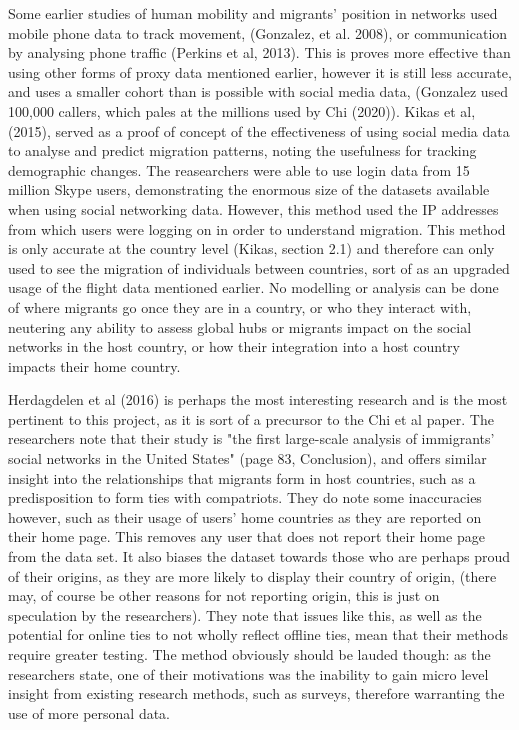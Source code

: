 \documentclass[12pt]{article}
\begin{document}
Some earlier studies of human mobility and migrants' position in networks used mobile phone data to 
track movement, (Gonzalez, et al. 2008), or communication by analysing phone traffic (Perkins et al, 2013).
This is proves more effective than using other forms of proxy data mentioned earlier,  
however it is still less accurate, and uses a smaller cohort than is possible with social media 
data, (Gonzalez used 100,000 callers, which pales at the millions used by Chi (2020)). 
Kikas et al, (2015), served as a proof of concept of the effectiveness of using social 
media data to analyse and predict migration patterns, noting the usefulness for tracking 
demographic changes. The reasearchers were able to use login data from 15 million 
Skype users, demonstrating the enormous size of the datasets available when using social 
networking data. However, this method used the IP addresses from which users were logging 
on in order to understand migration. This method is only accurate at the country level (Kikas, section 2.1)
and therefore can only used to see the migration of individuals between countries,
sort of as an upgraded usage of the flight data mentioned earlier. No modelling or 
analysis can be done of where migrants go once they are in a country, or who they interact 
with, neutering any ability to assess global hubs or migrants impact on the social 
networks in the host country, or how their integration into a host country impacts their 
home country.

Herdagdelen et al (2016) is perhaps the most interesting research and is the most 
pertinent to this project, as it is sort of a precursor to the Chi et al paper. The researchers 
note that their study is "the first large-scale analysis of immigrants’ social networks in the United States" (page 83, Conclusion),
and offers similar insight into the relationships that migrants form in host countries, such 
as a predisposition to form ties with compatriots. They do note some inaccuracies however, 
such as their usage of users' home countries as they are reported on their home page. This 
removes any user that does not report their home page from the data set. It also biases 
the dataset towards those who are perhaps proud of their origins, as they are more likely 
to display their country of origin, (there may, of course be other reasons for not reporting 
origin, this is just on speculation by the researchers). They note that issues like this, 
as well as the potential for online ties to not wholly reflect offline ties, mean that 
their methods require greater testing. The method obviously should be lauded though: as 
the researchers state, one of their motivations was the inability to gain micro level insight
from existing research methods, such as surveys, therefore warranting the use of more 
personal data. 
\end{document}
